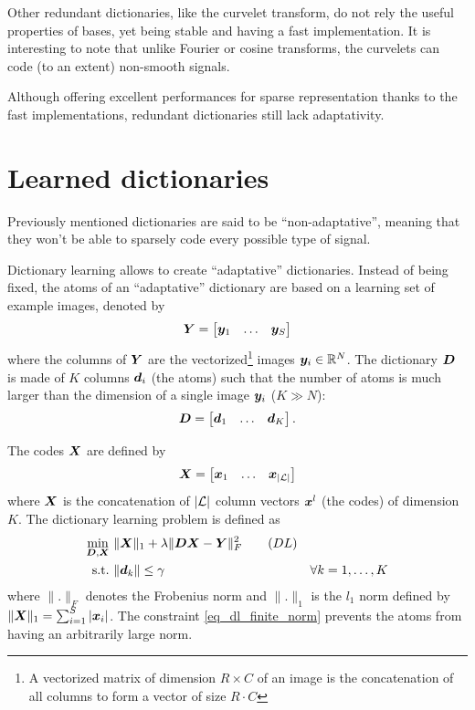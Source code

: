 Other redundant dictionaries, like the curvelet transform, do not rely the useful properties of bases, yet being stable and having a fast implementation. It is interesting to note that unlike Fourier or cosine transforms, the curvelets can code (to an extent) non-smooth signals.


Although offering excellent performances for sparse representation thanks to the fast implementations, redundant dictionaries still lack adaptativity.


\section{Learned dictionaries}
Previously mentioned dictionaries are said to be “non-adaptative”, meaning that they won’t be able to sparsely code every possible type of signal.

Dictionary learning allows to create “adaptative” dictionaries. Instead of being fixed, the atoms of an “adaptative” dictionary are based on a learning set of example images, denoted by
$$\bm{Y} = \begin{bmatrix} \bm{y}_1 & \dots & \bm{y}_S \end{bmatrix}$$
where the columns of $\bm{Y}$ are the vectorized\footnote{A vectorized matrix of dimension $R \times C$ of an image is the concatenation of all columns to form a vector of size $R \cdot C$} images $\bm{y}_i \in \mathbb{R}^N$. The dictionary $\bm{D}$ is made of $K$ columns $\bm{d}_i$ (the atoms) such that the number of atoms is much larger than the dimension of a single image $\bm{y}_i$ ($K \gg N$):
$$\bm{D} = \begin{bmatrix} \bm{d}_1 & \dots & \bm{d}_K \end{bmatrix}.$$

The codes $\bm{X}$ are defined by
$$\bm{X} = \begin{bmatrix} \bm{x}_1 & \dots & \bm{x}_{|\mathcal L|} \end{bmatrix}$$
where $\bm{X}$ is the concatenation of $|\mathcal L|$ column vectors $\bm{x}^l$ (the codes) of dimension $K$. The dictionary learning problem is defined as
\begin{align}
\underset{\bm{D},\bm{X}}{\min}~ & \lVert \bm{X} \rVert_1 + \lambda\lVert \bm{D}\bm{X}-\bm{Y} \rVert^2_F \tag{$DL$} \label{eq_dl} \\
\text{s.t.}~ & \lVert \bm{d}_k \rVert \le \gamma & \forall k = 1,\dots,K\label{eq_dl_finite_norm}
\end{align}
where $\lVert . \rVert_F$ denotes the Frobenius norm and $\lVert . \rVert_1$ is the $l_1$ norm defined by $\lVert \bm{X} \rVert_1 = \sum_{i=1}^S |\bm{x}_i|$. The constraint \ref{eq_dl_finite_norm} prevents the atoms from having an arbitrarily large norm.

